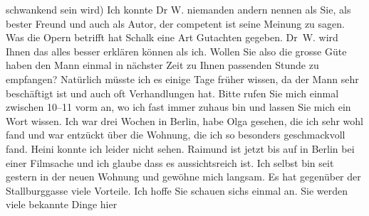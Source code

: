 \begin{ledgroupsized}[t]{13cm}
               schwankend sein wird) Ich konnte Dr W.
               niemanden andern nennen als Sie, als bester Freund und auch als Autor, der competent
               ist seine Meinung zu sagen. Was die Opern betrifft hat Schalk eine Art Gutachten gegeben. Dr W. wird Ihnen das alles besser erklären können als ich.
               Wollen Sie also die grosse Güte haben den Mann einmal in nächster Zeit zu \label{T_L02535-1v}\label{T_L02535-1h} Ihnen passenden
               Stunde zu empfangen? Natürlich müsste ich es einige Tage früher wissen, da der Mann sehr beschäftigt ist und auch oft
               Verhandlungen hat. Bitte rufen Sie mich einmal zwischen 10–11 vorm an,
               wo ich fast immer zuhaus bin und lassen Sie mich ein Wort wissen.\pend
           \pstart
           Ich war drei Wochen in Berlin, habe Olga gesehen, die ich sehr wohl fand und war
               entzückt über die Wohnung, die ich so besonders geschmackvoll fand. Heini konnte ich leider nicht sehen. Raimund ist jetzt bis auf \label{T_L02535-2v}\label{T_L02535-2h} in Berlin bei einer Filmsache und ich glaube dass es aussichtsreich ist. Ich
               selbst bin seit gestern in der neuen Wohnung und gewöhne mich langsam. Es hat
               gegenüber der Stallburggasse viele
               Vorteile.\pend
           \pstart
           Ich hoffe Sie schauen sichs einmal an. Sie werden viele bekannte Dinge hier

\end{ledgroupsized}
